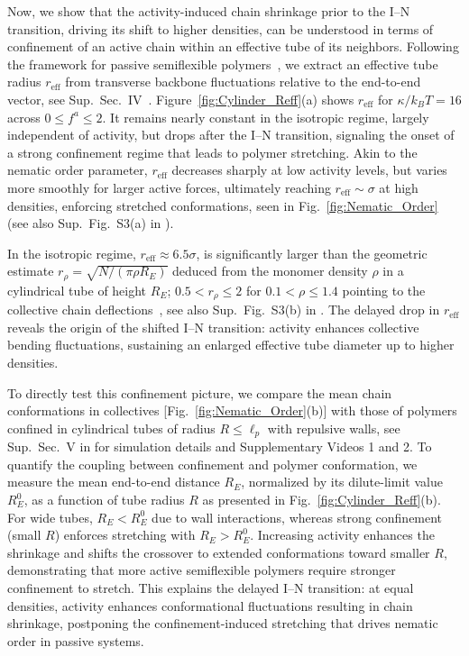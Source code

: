 \documentclass[
reprint,
superscriptaddress,
prl,









 amsmath,amssymb,
 aps,






]{revtex4-2}
\begin{document}
Now, we show that the activity-induced chain shrinkage prior to the I–N transition,  driving its shift to higher densities, can be understood in terms of  confinement of an active chain  within an effective tube of its neighbors.
Following the framework for passive semiflexible polymers~\cite{Binder_PRL_2016,Egorov2016}, we extract an effective tube radius $r_{\text{eff}}$ from transverse backbone fluctuations relative to the end-to-end vector, see Sup.~Sec.~IV~\cite{SM}. Figure~\ref{fig:Cylinder_Reff}(a) shows $r_{\text{eff}}$ for $\kappa/k_BT=16$ across $ 0\le f^{a}\le 2$. It remains nearly constant in the isotropic regime, largely independent of activity, but drops after the I--N transition, signaling the onset of a strong confinement regime that leads to polymer stretching. Akin to the nematic order parameter, $r_{\text{eff}}$ decreases sharply at low activity levels, but varies more smoothly for larger active forces, ultimately reaching $r_{\text{eff}}\sim\sigma$ at high densities, enforcing stretched conformations, seen in Fig.~\ref{fig:Nematic_Order} (see also Sup.~Fig.~S3(a) in \cite{SM}).

In the isotropic regime, $r_{\text{eff}} \approx 6.5\sigma$, is significantly larger than the geometric estimate $r_\rho=\sqrt{N/(\pi \rho R_E)}$ deduced from the monomer density $\rho$ in a cylindrical tube of height $R_E$; $0.5<r_\rho\leq 2$ for $0.1<\rho\leq 1.4$ pointing to the collective chain deflections~\cite{Binder_PRL_2016}, see also Sup.~Fig.~S3(b) in \cite{SM}. The delayed drop in $r_{\text{eff}}$ reveals the origin of the shifted I–N transition: activity enhances collective bending fluctuations, sustaining an enlarged effective tube diameter up to higher densities.


To directly test this confinement picture, we compare the mean chain conformations in collectives [Fig.~\ref{fig:Nematic_Order}(b)] with those of polymers confined in cylindrical tubes of radius $R \leq \ell_p$ with repulsive walls, see Sup.~Sec.~V in \cite{SM} for simulation details and Supplementary Videos 1 and 2. To quantify the coupling between confinement and polymer conformation, we measure the mean end-to-end distance $R_E$, normalized by its dilute-limit value $R_E^0$, as a function of tube radius $R$ as presented in Fig.~\ref{fig:Cylinder_Reff}(b). For wide tubes, $R_E<R_E^0$ due to wall interactions, whereas strong confinement (small $R$) enforces stretching with $R_E>R_E^0$. Increasing activity enhances the shrinkage and shifts the crossover to extended conformations toward smaller $R$, demonstrating that more active semiflexible polymers require stronger confinement to stretch. This explains the delayed I–N transition: at equal densities, activity enhances conformational fluctuations resulting in chain shrinkage, postponing the confinement-induced stretching that drives nematic order in passive systems.
\end{document}
